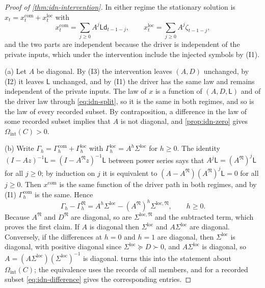 \begin{proof}[Proof of \cref{thm:idn-intervention}]
In either regime the stationary solution is $x_t=x^{\mathrm{com}}_t+x^{\mathrm{loc}}_t$ with
\begin{equation}\label{eq:idn-split}
x^{\mathrm{com}}_t=\sum_{j\ge0}A^j\mathsf L\mathsf d_{t-1-j},\qquad x^{\mathrm{loc}}_t=\sum_{j\ge0}A^j\zeta_{t-1-j},
\end{equation}
and the two parts are independent because the driver is independent of the private inputs, which under the intervention include the injected symbols by (I1).

(a) Let $A$ be diagonal. By (I3) the intervention leaves $(A,D)$ unchanged, by (I2) it leaves $\mathsf L$ unchanged, and by (I1) the driver has the same law and remains independent of the private inputs. The law of $x$ is a function of $(A,D,\mathsf L)$ and of the driver law through \cref{eq:idn-split}, so it is the same in both regimes, and so is the law of every recorded subset. By contraposition, a difference in the law of some recorded subset implies that $A$ is not diagonal, and \cref{prop:idn-zero} gives $\Omega_{\mathrm{int}}(C)>0$.

(b) Write $\Gamma_h=\Gamma^{\mathrm{com}}_h+\Gamma^{\mathrm{loc}}_h$ with $\Gamma^{\mathrm{loc}}_h=A^h\Sigma^{\mathrm{loc}}$ for $h\ge0$. The identity $(I-Az)^{-1}\mathsf L=(I-A^{\mathfrak N}z)^{-1}\mathsf L$ between power series says that $A^j\mathsf L=(A^{\mathfrak N})^j\mathsf L$ for all $j\ge0$; by induction on $j$ it is equivalent to $(A-A^{\mathfrak N})(A^{\mathfrak N})^j\mathsf L=0$ for all $j\ge0$. Then $x^{\mathrm{com}}$ is the same function of the driver path in both regimes, and by (I1) $\Gamma^{\mathrm{com}}_h$ is the same. Hence
\begin{equation}\label{eq:idn-difference}
\Gamma_h-\Gamma_h^{\mathfrak N}=A^h\Sigma^{\mathrm{loc}}-(A^{\mathfrak N})^h\Sigma^{\mathrm{loc},\mathfrak N},\qquad h\ge0.
\end{equation}
Because $A^{\mathfrak N}$ and $D^{\mathfrak N}$ are diagonal, so are $\Sigma^{\mathrm{loc},\mathfrak N}$ and the subtracted term, which proves the first claim. If $A$ is diagonal then $\Sigma^{\mathrm{loc}}$ and $A\Sigma^{\mathrm{loc}}$ are diagonal. Conversely, if the differences at $h=0$ and $h=1$ are diagonal, then $\Sigma^{\mathrm{loc}}$ is diagonal, with positive diagonal since $\Sigma^{\mathrm{loc}}\succeq D\succ0$, and $A\Sigma^{\mathrm{loc}}$ is diagonal, so $A=(A\Sigma^{\mathrm{loc}})(\Sigma^{\mathrm{loc}})^{-1}$ is diagonal.  turns this into the statement about $\Omega_{\mathrm{int}}(C)$; the equivalence uses the records of all members, and for a recorded subset \cref{eq:idn-difference} gives the corresponding entries.


\end{proof}
